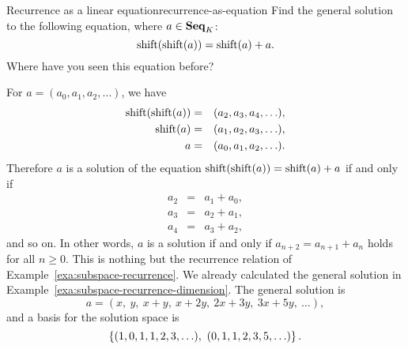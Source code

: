 \begin{example}{Recurrence as a linear equation}{recurrence-as-equation}
  Find the general solution to the following equation, where
  $a\in\mathbf{Seq}_K$:
  \begin{equation*}
    \shift(\shift(a)) = \shift(a) + a.
  \end{equation*}
  Where have you seen this equation before?
\end{example}

\begin{solution}
  For $a=(a_0,a_1,a_2,\ldots)$, we have
  \begin{eqnarray*}
    \shift(\shift(a)) &=& (a_2,a_3,a_4,\ldots), \\
    \shift(a) &=& (a_1,a_2,a_3,\ldots), \\
    a &=& (a_0,a_1,a_2,\ldots).
  \end{eqnarray*}
  Therefore $a$ is a solution of the equation $\shift(\shift(a)) =
  \shift(a) + a$ if and only if
  \begin{eqnarray*}
    a_2 &=& a_1 + a_0, \\
    a_3 &=& a_2 + a_1, \\
    a_4 &=& a_3 + a_2,
  \end{eqnarray*}
  and so on. In other words, $a$ is a solution if and only if
  $a_{n+2} = a_{n+1} + a_n$ holds for all $n\geq 0$. This is nothing
  but the recurrence relation of
  Example~\ref{exa:subspace-recurrence}. We already calculated the
  general solution in
  Example~{\ref{exa:subspace-recurrence-dimension}}. The general
  solution is
  \begin{equation*}
    a = (x,~y,~x+y,~x+2y,~2x+3y,~3x+5y,~\ldots),
  \end{equation*}
  and a basis for the solution space is
  \begin{equation*}
    \left\{(1,0,1,1,2,3,\ldots),~ (0,1,1,2,3,5,\ldots)\right\}.
  \end{equation*}
\end{solution}
